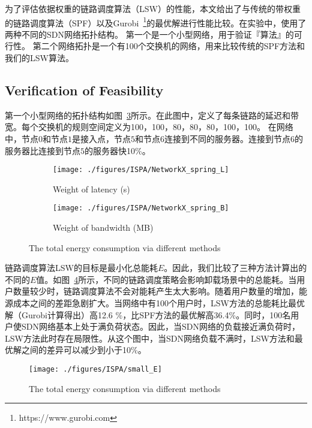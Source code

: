 为了评估依据权重的链路调度算法（LSW）的性能，本文给出了与传统的带权重的链路调度算法（SPF）以及Gurobi~\footnote{https://www.gurobi.com}的最优解进行性能比较。在实验中，使用了两种不同的SDN网络拓扑结构。 第一个是一个小型网络，用于验证『算法』的可行性。 第二个网络拓扑是一个有100个交换机的网络，用来比较传统的SPF方法和我们的LSW算法。

\subsection{Verification of Feasibility}

第一个小型网络的拓扑结构如图~\ref{fig_smallNetwork}所示。在此图中，定义了每条链路的延迟和带宽。每个交换机的规则空间定义为100，100，80，80，80，100，100。 在网络中，节点$0$和节点$1$是接入点，节点$5$和节点$6$连接到不同的服务器。连接到节点$6$的服务器比连接到节点$5$的服务器快10\%。

\begin{figure}[!h]
  \centering
  \begin{subfigure}[b]{0.45\linewidth}
    \texttt{[image: ./figures/ISPA/NetworkX\_spring\_L]}
    \label{fig_smallNetworkL}
    \caption{Weight of latency (s)}
  \end{subfigure} %
  \begin{subfigure}[b]{0.45\linewidth}    
    \texttt{[image: ./figures/ISPA/NetworkX\_spring\_B]}
    \label{fig_smallNetworkB}    
    \caption{Weight of bandwidth (MB)}
  \end{subfigure} 
  \caption{The total energy consumption via different methods}
  \label{fig_smallNetwork}
\end{figure}

链路调度算法LSW的目标是最小化总能耗$E$。因此，我们比较了三种方法计算出的不同的$E$值。如图~\ref{fig_smallE}所示，不同的链路调度策略会影响卸载场景中的总能耗。当用户数量较少时，链路调度算法不会对能耗产生太大影响。随着用户数量的增加，能源成本之间的差距急剧扩大。当网络中有100个用户时，LSW方法的总能耗比最优解（Gurobi计算得出）高12.6 \%，比SPF方法的最优解高36.4\%。同时，100名用户使SDN网络基本上处于满负荷状态。因此，当SDN网络的负载接近满负荷时，LSW方法此时存在局限性。从这个图中，当SDN网络负载不满时，LSW方法和最优解之间的差异可以减少到小于10\%。

\begin{figure}[!h]
\centering
\texttt{[image: ./figures/ISPA/small\_E]}
\vspace{-1em}
\caption{The total energy consumption via different methods}
\vspace{-0.5em}
\label{fig_smallE}
\end{figure}

